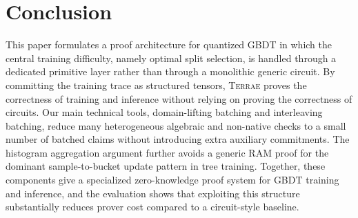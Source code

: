\section{Conclusion}\label{sec:conclusion}

This paper formulates a proof architecture for quantized GBDT in which the
central training difficulty, namely optimal split selection, is handled through
a dedicated primitive layer rather than through a monolithic generic circuit.
By committing the training trace as structured tensors, \textsc{Terrae} proves the correctness of training and inference without relying on proving the correctness of circuits.
Our main technical
tools, domain-lifting batching and interleaving batching, reduce many
heterogeneous algebraic and non-native checks to a small number of batched
claims without introducing extra auxiliary commitments. The histogram
aggregation argument further avoids a generic RAM proof for the dominant
sample-to-bucket update pattern in tree training. Together, these components
give a specialized zero-knowledge proof system for GBDT training and inference,
and the evaluation shows that exploiting this structure substantially reduces
prover cost compared to a circuit-style baseline.
